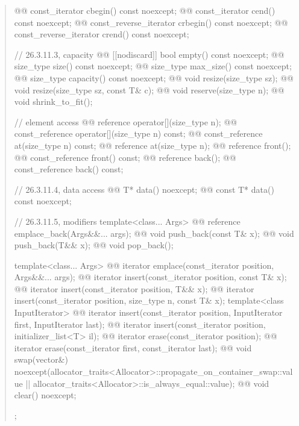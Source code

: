 \documentclass{wg21}
\begin{document}
\begin{quote}
\begin{codeblock}
{{    @@ const_iterator         cbegin() const noexcept;
    @@ const_iterator         cend() const noexcept;
    @@ const_reverse_iterator crbegin() const noexcept;
    @@ const_reverse_iterator crend() const noexcept;

    // 26.3.11.3, capacity
    @@ [[nodiscard]] bool empty() const noexcept;
    @@ size_type size() const noexcept;
    @@ size_type max_size() const noexcept;
    @@ size_type capacity() const noexcept;
    @@ void      resize(size_type sz);
    @@ void      resize(size_type sz, const T& c);
    @@ void      reserve(size_type n);
    @@ void      shrink_to_fit();

    // element access
    @@ reference       operator[](size_type n);
    @@ const_reference operator[](size_type n) const;
    @@ const_reference at(size_type n) const;
    @@ reference       at(size_type n);
    @@ reference       front();
    @@ const_reference front() const;
    @@ reference       back();
    @@ const_reference back() const;

    // 26.3.11.4, data access
    @@ T*       data() noexcept;
    @@ const T* data() const noexcept;

    // 26.3.11.5, modifiers
    template<class... Args> @@ reference emplace_back(Args&&... args);
    @@ void push_back(const T& x);
    @@ void push_back(T&& x);
    @@ void pop_back();

    template<class... Args> @@ iterator emplace(const_iterator position, Args&&... args);
    @@ iterator insert(const_iterator position, const T& x);
    @@ iterator insert(const_iterator position, T&& x);
    @@ iterator insert(const_iterator position, size_type n, const T& x);
    template<class InputIterator>
      @@ iterator insert(const_iterator position, InputIterator first, InputIterator last);
    @@ iterator insert(const_iterator position, initializer_list<T> il);
    @@ iterator erase(const_iterator position);
    @@ iterator erase(const_iterator first, const_iterator last);
    @@ void     swap(vector&)
      noexcept(allocator_traits<Allocator>::propagate_on_container_swap::value ||
               allocator_traits<Allocator>::is_always_equal::value);
    @@ void     clear() noexcept;
  };

}
\end{codeblock}
\end{quote}
\end{document}
